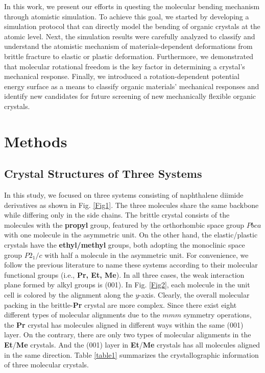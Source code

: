 \documentclass[prb,superscriptaddress,longbibliography, twocolumn]{revtex4-1}
\begin{document}
In this work, we present our efforts in questing the molecular bending mechanism through atomistic simulation. To achieve this goal, we started by developing a simulation protocol that can directly model the bending of organic crystals at the atomic level. Next, the simulation results were carefully analyzed to classify and understand the atomistic mechanism of materials-dependent deformations from brittle fracture to elastic or plastic deformation. Furthermore, we demonstrated that molecular rotational freedom is the key factor in determining a crystal's mechanical response. Finally, we introduced a rotation-dependent potential energy surface as a means to classify organic materials' mechanical responses and identify new candidates for future screening of new mechanically flexible organic crystals.

\section{Methods}

\subsection{Crystal Structures of Three Systems}
In this study, we focused on three systems consisting of naphthalene diimide derivatives as shown in Fig. \ref{Fig1}. The three molecules share the same backbone while differing only in the side chains. The brittle crystal consists of the molecules with the \textbf{propyl} group, featured by the orthorhombic space group $Pbca$ with one molecule in the asymmetric unit. On the other hand, the elastic/plastic crystals have the \textbf{ethyl/methyl} groups, both adopting the monoclinic space group $P2_1/c$ with half a molecule in the asymmetric unit. For convenience, we follow the previous literature \cite{devarapalli2019remarkably} to name these systems according to their molecular functional groups (i.e., \textbf{Pr, Et, Me}). In all three cases, the weak interaction plane formed by alkyl groups is (001). In Fig. \ref{Fig2}, each molecule in the unit cell is colored by the alignment along the $y$-axis. Clearly, the overall molecular packing in the brittle-\textbf{Pr} crystal are more complex. Since there exist eight different types of molecular alignments due to the $mmm$ symmetry operations, the \textbf{Pr} crystal has molecules aligned in different ways within the same (001) layer. On the contrary, there are only two types of molecular alignments in the \textbf{Et}/\textbf{Me} crystals. And the (001) layer in \textbf{Et}/\textbf{Me} crystals has all molecules aligned in the same direction. Table \ref{table1} summarizes the crystallographic information of three molecular crystals.  
\end{document}
